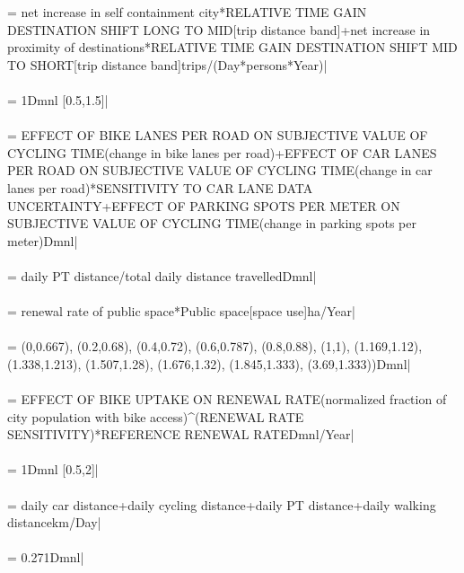  = {\small net increase in self containment city*RELATIVE TIME GAIN DESTINATION SHIFT LONG TO MID[trip distance band]+net increase in proximity of destinations*RELATIVE TIME GAIN DESTINATION SHIFT MID TO SHORT[trip distance band]trips/(Day*persons*Year)|} \\ \\ 
 = {\small 1Dmnl [0.5,1.5]|} \\ \\ 
 = {\small EFFECT OF BIKE LANES PER ROAD ON SUBJECTIVE VALUE OF CYCLING TIME(change in bike lanes per road)+EFFECT OF CAR LANES PER ROAD ON SUBJECTIVE VALUE OF CYCLING TIME(change in car lanes per road)*SENSITIVITY TO CAR LANE DATA UNCERTAINTY+EFFECT OF PARKING SPOTS PER METER ON SUBJECTIVE VALUE OF CYCLING TIME(change in parking spots per meter)Dmnl|} \\ \\ 
 = {\small daily PT distance/total daily distance travelledDmnl|} \\ \\ 
 = {\small renewal rate of public space*Public space[space use]ha/Year|} \\ \\ 
 = {\small (0,0.667), (0.2,0.68), (0.4,0.72), (0.6,0.787), (0.8,0.88), (1,1), (1.169,1.12), (1.338,1.213), (1.507,1.28), (1.676,1.32), (1.845,1.333), (3.69,1.333))Dmnl|} \\ \\ 
 = {\small EFFECT OF BIKE UPTAKE ON RENEWAL RATE(normalized fraction of city population with bike access)\^{}(RENEWAL RATE SENSITIVITY)*REFERENCE RENEWAL RATEDmnl/Year|} \\ \\ 
 = {\small 1Dmnl [0.5,2]|} \\ \\ 
 = {\small daily car distance+daily cycling distance+daily PT distance+daily walking distancekm/Day|} \\ \\ 
 = {\small 0.271Dmnl|} \\ \\ 
